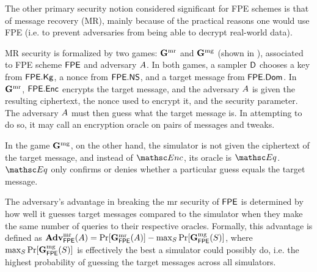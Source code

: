 
The other primary security notion considered significant for FPE schemes is that of message recovery (MR), mainly because of the practical reasons one would use FPE (i.e. to prevent adversaries from being able to decrypt real-world data).\

 MR security is formalized by two games: $\mathbf{G}^{\rm mr}_{}$ and $\mathbf{G}^{\rm mg}_{}$ (shown in ), associated to FPE scheme $\mathsf{FPE}$ and adversary $A$. In both games, a sampler $\mathsf{D}$ chooses a key from $\mathsf{FPE}.\mathsf{Kg}$, a nonce from $\mathsf{FPE}.\mathsf{NS}$, and a target message from $\mathsf{FPE}.\mathsf{Dom}$. In $\mathbf{G}^{\rm mr}_{}$, $\mathsf{FPE}.\mathsf{Enc}$ encrypts the target message, and the adversary $A$ is given the resulting ciphertext, the nonce used to encrypt it, and the security parameter. The adversary $A$ must then guess what the target message is. In attempting to do so, it may call an encryption oracle on pairs of messages and tweaks. \
 
 In the game $\mathbf{G}^{\rm mg}_{}$, on the other hand, the simulator is not given the ciphertext of the target message, and instead of $\EncO$, its oracle is $\EqO$. $\EqO$ only confirms or denies whether a particular guess equals the target message.\
 
 The adversary's advantage in breaking the mr security of $\mathsf{FPE}$ is determined by how well it guesses target messages compared to the simulator when they make the same number of queries to their respective oracles. Formally, this advantage is defined as $\mathbf{Adv}^{\rm mr}_{\mathsf{FPE}}(A) = \Pr[\mathbf{G}^{\rm mr}_{\mathsf{FPE}}(A)]- \max_{S}\Pr[\mathbf{G}^{\rm mg}_{\mathsf{FPE}}(S)]$, where $\max_{S}\Pr[\mathbf{G}^{\rm mg}_{\mathsf{FPE}}(S)]$ is effectively the best a simulator could possibly do, i.e. the highest probability of guessing the target messages across all simulators.


